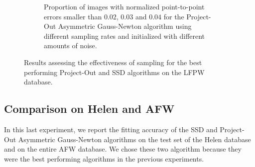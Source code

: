 \begin{figure}[h!]
\begin{subfigure}{0.48\textwidth}
	    \caption{Proportion of images with normalized point-to-point errors smaller than $0.02$, $0.03$ and $0.04$ for the Project-Out Asymmetric Gauss-Newton algorithm using different sampling rates and initialized with different amounts of noise.}
	    \label{fig:sampling_vs_noise_po_asy_gn}
	\end{subfigure}
	\caption{Results assessing the effectiveness of sampling for the best performing Project-Out and SSD algorithms on the LFPW database.}
	\label{fig:sampling}
\end{figure}


\subsection{Comparison on Helen and AFW}

In this last experiment, we report the fitting accuracy of the SSD and Project-Out Asymmetric Gauss-Newton algorithms on the test set of the Helen database and on the entire AFW database. We chose these two algorithm because they were the best performing algorithms in the previous experiments. 

